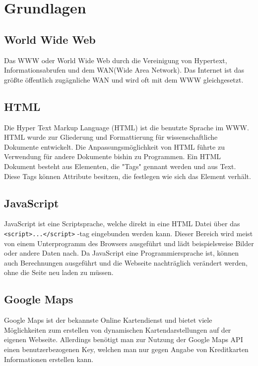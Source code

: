 \documentclass[a4paper, 12pt]{scrreprt}
\begin{document}
\chapter{Grundlagen}
\section{World Wide Web}
Das WWW oder World Wide Web\cite{berners1992world} durch die Vereinigung von Hypertext, Informationsabrufen und dem WAN(Wide Area Network).
Das Internet ist das größte öffentlich zugägnliche WAN und wird oft mit dem WWW gleichgesetzt.
\section{HTML}
Die Hyper Text Markup Language (HTML) ist die benutzte Sprache im WWW.
HTML wurde zur Gliederung und Formattierung für wissenschaftliche Dokumente entwickelt.
Die Anpassungsmöglichkeit von HTML führte zu Verwendung für andere Dokumente bishin zu Programmen.
Ein HTML Dokument besteht aus Elementen, die "Tags" gennant werden und aus Text.
Diese Tags können Attribute besitzen, die festlegen wie sich das Element verhält.\cite{htmlspec}
\section{JavaScript}
JavaScript ist eine Scriptsprache, welche direkt in eine HTML Datei über das \verb+<script>...</script>+ -tag eingebunden werden kann.
Dieser Bereich wird meist von einem Unterprogramm des Browsers ausgeführt und lädt beispielsweise Bilder oder andere Daten nach.
Da JavaScript eine Programmiersprache ist, können auch Berechnungen ausgeführt und die Webseite nachträglich verändert werden, ohne die Seite neu laden zu müssen.\cite{javascriptreferenz}
\section{Google Maps}
Google Maps\cite{gmaps} ist der bekannste Online Kartendienst und bietet viele Möglichkeiten zum erstellen von dynamischen Kartendarstellungen auf der eigenen Webseite.
Allerdings benötigt man zur Nutzung der Google Maps API\cite{gmapsapi} einen benutzerbezogenen Key, welchen man nur gegen Angabe von Kreditkarten Informationen erstellen kann.
\end{document}
